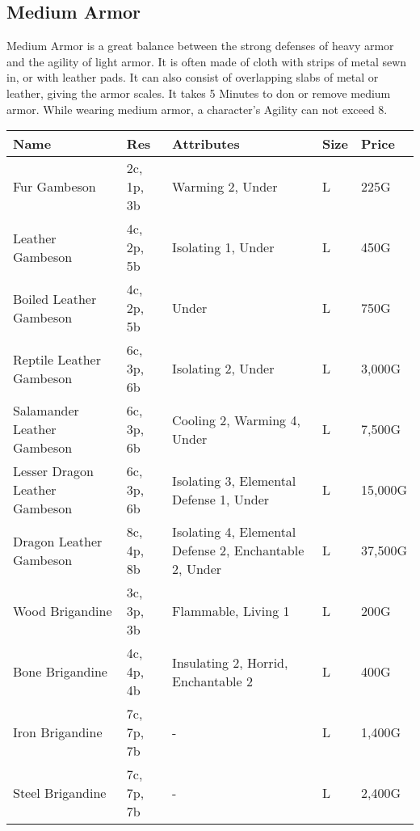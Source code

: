 \subsection{Medium Armor}\label{subsec:mediumArmor}
Medium Armor is a great balance between the strong defenses of heavy armor and the agility of light armor.
It is often made of cloth with strips of metal sewn in, or with leather pads.
It can also consist of overlapping slabs of metal or leather, giving the armor scales.
It takes 5 Minutes to don or remove medium armor.
While wearing medium armor, a character's Agility can not exceed 8.

\begin{longtable}{p{3.5cm} | p{1.5cm} | p{5cm} | p{1cm} | p{1.25cm}}
	Name & Res & Attributes & Size & Price\\ \hline
	
	Fur Gambeson & 2c, 1p, 3b & Warming 2, Under & L & 225G\\
	
	Leather Gambeson & 4c, 2p, 5b & Isolating 1, Under & L & 450G\\
	
	Boiled Leather Gambeson & 4c, 2p, 5b & Under & L & 750G\\
	
	Reptile Leather Gambeson & 6c, 3p, 6b & Isolating 2, Under & L & 3,000G\\
	
	Salamander Leather Gambeson & 6c, 3p, 6b & Cooling 2, Warming 4, Under & L & 7,500G\\
	
	Lesser Dragon Leather Gambeson & 6c, 3p, 6b & Isolating 3, Elemental Defense 1, Under & L & 15,000G\\
	
	Dragon Leather Gambeson & 8c, 4p, 8b & Isolating 4, Elemental Defense 2, Enchantable 2, Under & L & 37,500G\\
	
	Wood Brigandine & 3c, 3p, 3b & Flammable, Living 1 & L & 200G\\
	
	Bone Brigandine & 4c, 4p, 4b & Insulating 2, Horrid, Enchantable 2 & L & 400G\\
	
	Iron Brigandine & 7c, 7p, 7b & - & L & 1,400G\\
	
	Steel Brigandine & 7c, 7p, 7b & - & L & 2,400G\\
	

\end{longtable}

